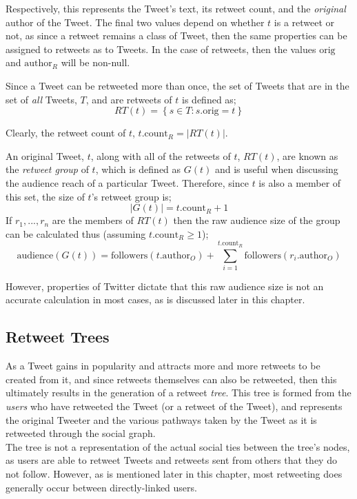 Respectively, this represents the Tweet's text, its retweet count, and the \textit{original} author of the Tweet. The final two values depend on whether $t$ is a retweet or not, as since a retweet remains a class of Tweet, then the same properties can be assigned to retweets as to Tweets. In the case of retweets, then the values $\mathrm{orig}$ and $\mathrm{author}_R$ will be non-null.

Since a Tweet can be retweeted more than once, the set of Tweets that are in the set of \textit{all} Tweets, $T$, and are retweets of $t$ is defined as;
\[
	RT(t) = \left\{ s \in T : s.\textrm{orig} = t \right\}
\]

Clearly, the retweet count of $t$, $ t.\mathrm{count}_R = \left\vert{RT(t)}\right\vert $.

An original Tweet, $t$, along with all of the retweets of $t$, $RT(t)$, are known as the \textit{retweet group} of $t$, which is defined as $G(t)$ and is useful when discussing the audience reach of a particular Tweet. Therefore, since $t$ is also a member of this set, the size of $t$'s retweet group is; 
\[
	\left\vert{G(t)}\right\vert = t.\mathrm{count}_R + 1 
\] 
If $ r_1,...,r_n $ are the members of $RT(t)$ then the raw audience size of the group can be calculated thus (assuming $t.\textrm{count}_R \geq 1$);
\[
	\textrm{audience}(G(t)) = \textrm{followers}(t.\textrm{author}_O) + \sum\limits_{i=1}^{t.\mathrm{count}_R} \textrm{followers}(r_i.\textrm{author}_O)
\]

However, properties of Twitter dictate that this raw audience size is not an accurate calculation in most cases, as is discussed later in this chapter.


\subsection{Retweet Trees}
As a Tweet gains in popularity and attracts more and more retweets to be created from it, and since retweets themselves can also be retweeted, then this ultimately results in the generation of a retweet \textit{tree}. This tree is formed from the \textit{users} who have retweeted the Tweet (or a retweet of the Tweet), and represents the original Tweeter and the various pathways taken by the Tweet as it is retweeted through the social graph.\\
The tree is not a representation of the actual social ties between the tree's nodes, as users are able to retweet Tweets and retweets sent from others that they do not follow. However, as is mentioned later in this chapter, most retweeting does generally occur between directly-linked users.

